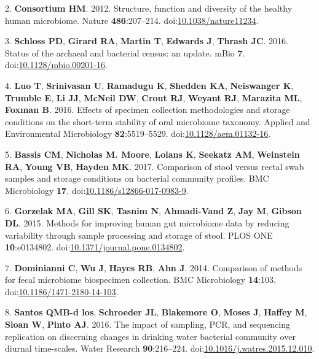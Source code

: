 \documentclass[11,]{article}
\begin{document}
2. \textbf{Consortium HM}. 2012. Structure, function and diversity of
the healthy human microbiome. Nature \textbf{486}:207--214.
doi:\href{http://dx.doi.org/10.1038/nature11234}{10.1038/nature11234}.

3. \textbf{Schloss PD}, \textbf{Girard RA}, \textbf{Martin T},
\textbf{Edwards J}, \textbf{Thrash JC}. 2016. Status of the archaeal and
bacterial census: an update. mBio \textbf{7}.
doi:\href{http://dx.doi.org/10.1128/mbio.00201-16}{10.1128/mbio.00201-16}.

4. \textbf{Luo T}, \textbf{Srinivasan U}, \textbf{Ramadugu K},
\textbf{Shedden KA}, \textbf{Neiswanger K}, \textbf{Trumble E},
\textbf{Li JJ}, \textbf{McNeil DW}, \textbf{Crout RJ}, \textbf{Weyant
RJ}, \textbf{Marazita ML}, \textbf{Foxman B}. 2016. Effects of specimen
collection methodologies and storage conditions on the short-term
stability of oral microbiome taxonomy. Applied and Environmental
Microbiology \textbf{82}:5519--5529.
doi:\href{http://dx.doi.org/10.1128/aem.01132-16}{10.1128/aem.01132-16}.

5. \textbf{Bassis CM}, \textbf{Nicholas M. Moore}, \textbf{Lolans K},
\textbf{Seekatz AM}, \textbf{Weinstein RA}, \textbf{Young VB},
\textbf{Hayden MK}. 2017. Comparison of stool versus rectal swab samples
and storage conditions on bacterial community profiles. BMC Microbiology
\textbf{17}.
doi:\href{http://dx.doi.org/10.1186/s12866-017-0983-9}{10.1186/s12866-017-0983-9}.

6. \textbf{Gorzelak MA}, \textbf{Gill SK}, \textbf{Tasnim N},
\textbf{Ahmadi-Vand Z}, \textbf{Jay M}, \textbf{Gibson DL}. 2015.
Methods for improving human gut microbiome data by reducing variability
through sample processing and storage of stool. PLOS ONE
\textbf{10}:e0134802.
doi:\href{http://dx.doi.org/10.1371/journal.pone.0134802}{10.1371/journal.pone.0134802}.

7. \textbf{Dominianni C}, \textbf{Wu J}, \textbf{Hayes RB}, \textbf{Ahn
J}. 2014. Comparison of methods for fecal microbiome biospecimen
collection. BMC Microbiology \textbf{14}:103.
doi:\href{http://dx.doi.org/10.1186/1471-2180-14-103}{10.1186/1471-2180-14-103}.

8. \textbf{Santos QMB-d los}, \textbf{Schroeder JL}, \textbf{Blakemore
O}, \textbf{Moses J}, \textbf{Haffey M}, \textbf{Sloan W}, \textbf{Pinto
AJ}. 2016. The impact of sampling, PCR, and sequencing replication on
discerning changes in drinking water bacterial community over diurnal
time-scales. Water Research \textbf{90}:216--224.
doi:\href{http://dx.doi.org/10.1016/j.watres.2015.12.010}{10.1016/j.watres.2015.12.010}.
\end{document}
